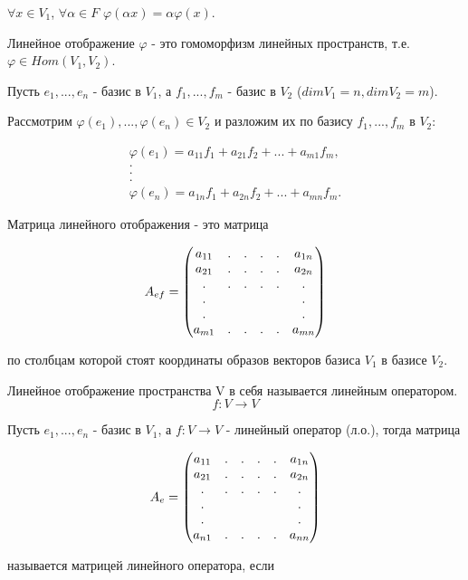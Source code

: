 \documentclass[../main.tex]{subfiles}
\begin{document}
 $\forall x\in V_1$, $\forall\alpha\in F$ $\varphi(\alpha x) = \alpha\varphi(x)$.

\void{} Линейное отображение $\varphi$ - это гомоморфизм линейных пространств, т.е. $\varphi\in Hom(V_1,V_2)$.

\void
Пусть $e_1,...,e_n$ - базис в $V_1$, а $f_1,...,f_m$ - базис в $V_2$ ($dimV_1 = n, dimV_2 = m$).

Рассмотрим $\varphi(e_1),...,\varphi(e_n)\in V_2$ и разложим их по базису $f_1,...,f_m$ в $V_2$:

$$\begin{matrix}
    \varphi(e_1) = a_{11} f_1 + a_{21} f_2 + ... + a_{m1} f_m,\\
    .\\
    .\\
    .\\
    \varphi(e_n) = a_{1n} f_1 + a_{2n} f_2 + ... + a_{mn} f_m.
\end{matrix}$$

\void{} Матрица линейного отображения - это матрица

$$A_{ef} = \begin{pmatrix} 
    a_{11} & . & . & . & . & a_{1n}\\
    a_{21} & . & . & . & . & a_{2n}\\
    . & . & . & . & . & .\\
    . &  &  &  &  & .\\
    . &  &  &  &  & .\\
    a_{m1} & . & . & . & . & a_{mn}\\
\end{pmatrix}$$

по столбцам которой стоят координаты образов векторов базиса $V_1$ в базисе $V_2$.

\void{} Линейное отображение пространства V в себя называется линейным оператором.
$$f: V\rightarrow V$$

\void{} Пусть $e_1,...,e_n$ - базис в $V_1$, а $f: V\rightarrow V$ - линейный оператор (л.о.), тогда матрица

$$A_{e} = \begin{pmatrix} 
    a_{11} & . & . & . & . & a_{1n}\\
    a_{21} & . & . & . & . & a_{2n}\\
    . & . & . & . & . & .\\
    . &  &  &  &  & .\\
    . &  &  &  &  & .\\
    a_{n1} & . & . & . & . & a_{nn}\\
\end{pmatrix}$$

называется матрицей линейного оператора, если
\end{document}
